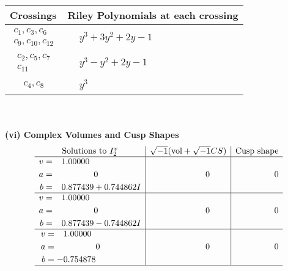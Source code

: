 \documentclass[1p]{elsarticle_modified}
\theoremstyle{definition}
\newcommand{\I}{\sqrt{-1}}
\begin{document}
\begin{tabular}{m{50pt}|m{274pt}}
Crossings & \hspace{64pt}Riley Polynomials at each crossing \\
\hline $$\begin{aligned}c_{1},c_{3},c_{6}\\c_{9},c_{10},c_{12}\end{aligned}$$&$\begin{aligned}
&y^3+3 y^2+2 y-1
\end{aligned}$\\
\hline $$\begin{aligned}c_{2},c_{5},c_{7}\\c_{11}\end{aligned}$$&$\begin{aligned}
&y^3- y^2+2 y-1
\end{aligned}$\\
\hline $$\begin{aligned}c_{4},c_{8}\end{aligned}$$&$\begin{aligned}
&y^3
\end{aligned}$\\
\hline
\end{tabular}\\~\\
\newpage\flushleft \textbf{(vi) Complex Volumes and Cusp Shapes}
$$\begin{array}{c|c|c}  
\text{Solutions to }I^v_{2}& \I (\text{vol} + \sqrt{-1}CS) & \text{Cusp shape}\\
 \hline 
\begin{aligned}
v &= \phantom{-}1.00000\phantom{ +0.000000I} \\
a &= \phantom{-0.000000 } 0 \\
b &= \phantom{-}0.877439 + 0.744862 I\end{aligned}
 & \phantom{-0.000000 } 0 & \phantom{-0.000000 } 0 \\ \hline\begin{aligned}
v &= \phantom{-}1.00000\phantom{ +0.000000I} \\
a &= \phantom{-0.000000 } 0 \\
b &= \phantom{-}0.877439 - 0.744862 I\end{aligned}
 & \phantom{-0.000000 } 0 & \phantom{-0.000000 } 0 \\ \hline\begin{aligned}
v &= \phantom{-}1.00000\phantom{ +0.000000I} \\
a &= \phantom{-0.000000 } 0 \\
b &= -0.754878\phantom{ +0.000000I}\end{aligned}
 & \phantom{-0.000000 } 0 & \phantom{-0.000000 } 0\\
 \hline 
 \end{array}$$\newpage
\end{document}
